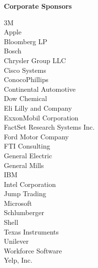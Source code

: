 \documentclass[twoside]{article}
\begin{document}
    { \fontsize{14}{17}\selectfont \bf Corporate Sponsors}
    \vspace{-1em}\begin{multicols}{2}3M\\
        Apple\\
        Bloomberg LP\\
        Bosch\\
        Chrysler Group LLC\\
        Cisco Systems\\
        ConocoPhillips\\
        Continental Automotive\\
        Dow Chemical\\
        Eli Lilly and Company\\
        ExxonMobil Corporation\\
        FactSet Research Systems Inc.\\
        Ford Motor Company\\
        FTI Consulting\\
        General Electric\\
        General Mills\\
        IBM\\
        Intel Corporation\\
        Jump Trading\\
        Microsoft\\
        Schlumberger\\
        Shell\\
        Texas Instruments\\
        Unilever\\
        Workforce Software\\
        Yelp, Inc.\\
        \end{multicols}
    
\end{document}
